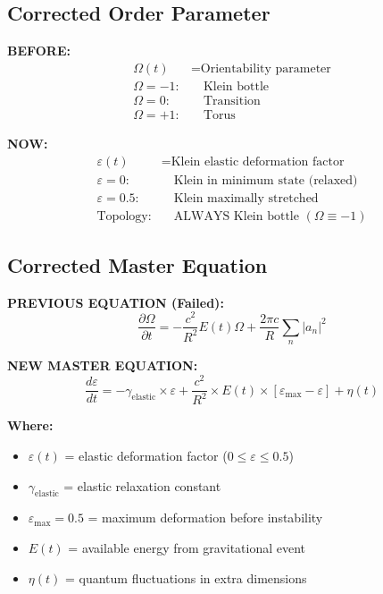 \documentclass[12pt,a4paper]{article}
\begin{document}
\subsection{Corrected Order Parameter}

\textbf{BEFORE:}
\begin{align}
\Omega(t) &= \text{Orientability parameter}\\
\Omega = -1: &\quad \text{Klein bottle}\\
\Omega = 0: &\quad \text{Transition}\\
\Omega = +1: &\quad \text{Torus}
\end{align}

\textbf{NOW:}
\begin{align}
\varepsilon(t) &= \text{Klein elastic deformation factor}\\
\varepsilon = 0: &\quad \text{Klein in minimum state (relaxed)}\\
\varepsilon = 0.5: &\quad \text{Klein maximally stretched}\\
\text{Topology:} &\quad \text{ALWAYS Klein bottle } (\Omega \equiv -1)
\end{align}

\subsection{Corrected Master Equation}

\textbf{PREVIOUS EQUATION (Failed):}
\begin{equation}
\frac{\partial\Omega}{\partial t} = -\frac{c^2}{R^2}E(t)\Omega + \frac{2\pi c}{R}\sum_n |a_n|^2
\end{equation}

\textbf{NEW MASTER EQUATION:}
\begin{equation}
\boxed{
\frac{d\varepsilon}{dt} = -\gamma_{\text{elastic}} \times \varepsilon + \frac{c^2}{R^2} \times E(t) \times [\varepsilon_{\max} - \varepsilon] + \eta(t)
}
\end{equation}

\textbf{Where:}
\begin{itemize}
\item $\varepsilon(t)$ = elastic deformation factor ($0 \leq \varepsilon \leq 0.5$)
\item $\gamma_{\text{elastic}}$ = elastic relaxation constant
\item $\varepsilon_{\max} = 0.5$ = maximum deformation before instability
\item $E(t)$ = available energy from gravitational event
\item $\eta(t)$ = quantum fluctuations in extra dimensions
\end{itemize}
\end{document}
